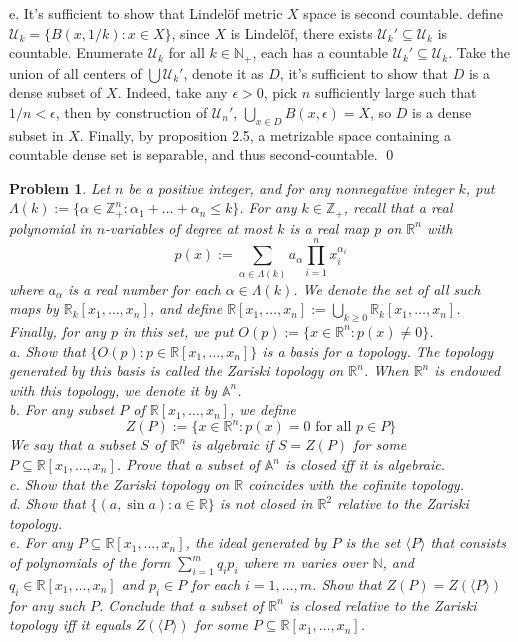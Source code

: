 \documentclass[12pt]{article}
\newtheorem{problem}{Problem}
\begin{document}
\indent e. It's sufficient to show that Lindelöf metric $X$ space is second countable. define $\mathcal{U}_{k}=\{B(x,1/k): x\in X\}$, since $X$ is Lindelöf, there exists $\mathcal{U}_{k}'\subseteq\mathcal{U}_{k}$ is countable. Enumerate $\mathcal{U}_{k}$ for all $k\in\mathbb{N}_{+}$, each has a countable $\mathcal{U}_{k}'\subseteq\mathcal{U}_{k}$. Take the union of all centers of $\bigcup \mathcal{U}_{k}'$, denote it as $D$, it's sufficient to show that $D$ is a dense subset of $X$. Indeed, take any $\epsilon>0$, pick $n$ sufficiently large such that $1/n < \epsilon$, then by construction of $\mathcal{U}_{n}'$, $\bigcup_{x\in D}B(x,\epsilon)=X$, so $D$ is a dense subset in $X$. Finally, by proposition 2.5, a metrizable space containing a countable dense set is separable, and thus second-countable. \qed
\\
\begin{problem}
Let $n$ be a positive integer, and for any nonnegative integer $k$, put $\Lambda(k):=\{\alpha\in\mathbb{Z}^{n}_{+}: \alpha_{1}+\dots+\alpha_{n}\leq k\}$. For any $k\in\mathbb{Z}_{+}$, recall that a real polynomial in $n$-variables of degree at most $k$ is a real map $p$ on $\mathbb{R}^{n}$ with 
$$
p(x):=\sum\limits_{\alpha\in\Lambda(k)}a_{\alpha}\prod\limits_{i=1}^{n}x_{i}^{\alpha_{i}}
$$
where $a_{\alpha}$ is a real number for each $\alpha\in\Lambda(k)$. We denote the set of all such maps by $\mathbb{R}_{k}[x_{1}, \dots, x_{n}]$, and define $\mathbb{R}[x_{1},\dots, x_{n}]:= \bigcup_{k\geq 0}\mathbb{R}_{k}[x_{1},\dots, x_{n}]$. Finally, for any $p$ in this set, we put $O(p):=\{x\in\mathbb{R}^{n}: p(x)\neq 0\}$. \\
\indent a. Show that $\{O(p): p\in\mathbb{R}[x_{1}, \dots, x_{n}]\}$ is a basis for a topology. The topology generated by this basis is called the Zariski topology on $\mathbb{R}^{n}$. When $\mathbb{R}^{n}$ is endowed with this topology, we denote it by $\mathbb{A}^{n}$. \\
\indent b. For any subset $P$ of $\mathbb{R}[x_{1}, \dots, x_{n}]$, we define
$$
Z(P):= \{x\in\mathbb{R}^{n}:p(x)=0\text{ for all }p\in P\}
$$
\indent We say that a subset $S$ of $\mathbb{R}^{n}$ is algebraic if $S=Z(P)$ for some $P\subseteq\mathbb{R}[x_{1}, \dots, x_{n}]$. Prove that a subset of $\mathbb{A}^{n}$ is closed iff it is algebraic. \\
\indent c. Show that the Zariski topology on $\mathbb{R}$ coincides with the cofinite topology. \\
\indent d. Show that $\{(a, \sin a): a\in\mathbb{R}\}$ is not closed in $\mathbb{R}^{2}$ relative to the Zariski topology. \\
\indent e. For any $P\subseteq\mathbb{R}[x_{1}, \dots, x_{n}]$, the ideal generated by $P$ is the set $\langle P\rangle$ that consists of polynomials of the form $\sum_{i=1}^{m}q_{i}p_{i}$ where $m$ varies over $\mathbb{N}$, and $q_{i}\in\mathbb{R}[x_{1}, \dots, x_{n}]$ and $p_{i}\in P$ for each $i=1,\dots, m$. Show that $Z(P)=Z(\langle P\rangle)$ for any such $P$. Conclude that a subset of $\mathbb{R}^{n}$ is closed relative to the Zariski topology iff it equals $Z(\langle P\rangle)$ for some $P\subseteq\mathbb{R}[x_{1}, \dots, x_{n}]$.
\end{problem}
\end{document}
